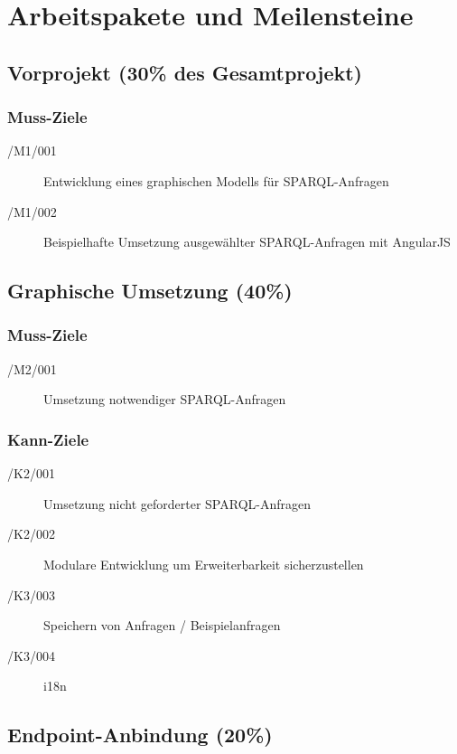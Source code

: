 \section{Arbeitspakete und Meilensteine}

\subsection*{Vorprojekt (30\% des Gesamtprojekt)}

\subsubsection*{Muss-Ziele}

\begin{description}
\item[/M1/001] Entwicklung eines graphischen Modells für SPARQL-Anfragen
\item[/M1/002] Beispielhafte Umsetzung ausgewählter SPARQL-Anfragen mit AngularJS
\end{description}

\subsection*{Graphische Umsetzung (40\%)}

\subsubsection*{Muss-Ziele}

\begin{description}
\item[/M2/001] Umsetzung notwendiger SPARQL-Anfragen
\end{description}

\subsubsection*{Kann-Ziele}
\begin{description}
\item[/K2/001] Umsetzung nicht geforderter SPARQL-Anfragen
\item[/K2/002] Modulare Entwicklung um Erweiterbarkeit sicherzustellen
\item[/K3/003] Speichern von Anfragen / Beispielanfragen
\item[/K3/004] i18n
\end{description}

\subsection*{Endpoint-Anbindung (20\%)}

